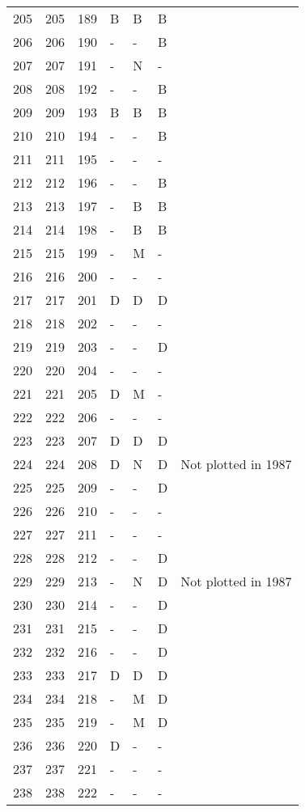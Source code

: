 \begin{longtable}{rrrllll}
  205 & 205 & 189 & B & B & B &  \\ 
  206 & 206 & 190 & - & - & B &  \\ 
  207 & 207 & 191 & - & N & - &  \\ 
  208 & 208 & 192 & - & - & B &  \\ 
  209 & 209 & 193 & B & B & B &  \\ 
  210 & 210 & 194 & - & - & B &  \\ 
  211 & 211 & 195 & - & - & - &  \\ 
  212 & 212 & 196 & - & - & B &  \\ 
  213 & 213 & 197 & - & B & B &  \\ 
  214 & 214 & 198 & - & B & B &  \\ 
  215 & 215 & 199 & - & M & - &  \\ 
  216 & 216 & 200 & - & - & - &  \\ 
  217 & 217 & 201 & D & D & D &  \\ 
  218 & 218 & 202 & - & - & - &  \\ 
  219 & 219 & 203 & - & - & D &  \\ 
  220 & 220 & 204 & - & - & - &  \\ 
  221 & 221 & 205 & D & M & - &  \\ 
  222 & 222 & 206 & - & - & - &  \\ 
  223 & 223 & 207 & D & D & D &  \\ 
  224 & 224 & 208 & D & N & D & Not plotted in 1987 \\ 
  225 & 225 & 209 & - & - & D &  \\ 
  226 & 226 & 210 & - & - & - &  \\ 
  227 & 227 & 211 & - & - & - &  \\ 
  228 & 228 & 212 & - & - & D &  \\ 
  229 & 229 & 213 & - & N & D & Not plotted in 1987 \\ 
  230 & 230 & 214 & - & - & D &  \\ 
  231 & 231 & 215 & - & - & D &  \\ 
  232 & 232 & 216 & - & - & D &  \\ 
  233 & 233 & 217 & D & D & D &  \\ 
  234 & 234 & 218 & - & M & D &  \\ 
  235 & 235 & 219 & - & M & D &  \\ 
  236 & 236 & 220 & D & - & - &  \\ 
  237 & 237 & 221 & - & - & - &  \\ 
  238 & 238 & 222 & - & - & - &  \\ 

\end{longtable}

